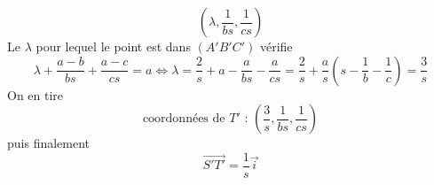 \begin{enumerate}
\begin{displaymath}
 \left( \lambda , \dfrac{1}{bs} , \dfrac{1}{cs}\right)
\end{displaymath}
Le $\lambda$ pour lequel le point est dans $(A'B'C')$ vérifie
\begin{displaymath}
 \lambda +\dfrac{a-b}{bs}+\dfrac{a-c}{cs}=a \Leftrightarrow
\lambda = \dfrac{2}{s}+a-\dfrac{a}{bs}-\dfrac{a}{cs}
=\dfrac{2}{s}+\dfrac{a}{s}\left( s-\dfrac{1}{b}-\dfrac{1}{c}\right)=\dfrac{3}{s} 
\end{displaymath}
On en tire
\begin{displaymath}
 \text{coordonnées de $T'$ : } \left( \dfrac{3}{s} , \dfrac{1}{bs} , \dfrac{1}{cs}\right) 
\end{displaymath}
puis finalement
\begin{displaymath}
 \overrightarrow{S'T'} = \dfrac{1}{s}\overrightarrow i
\end{displaymath}

\end{enumerate}
